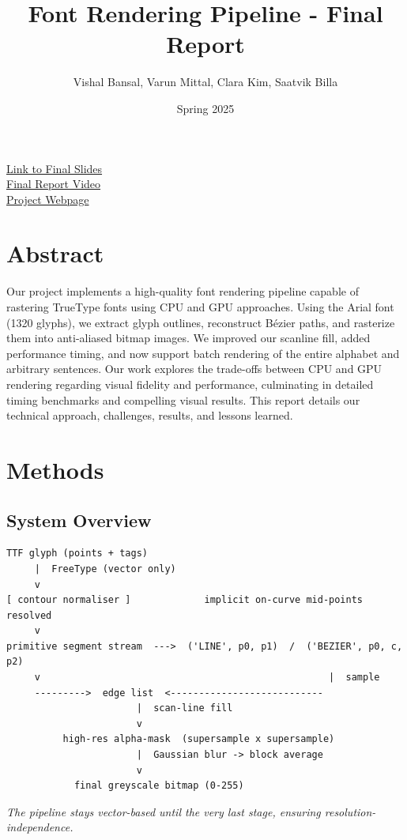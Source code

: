 \documentclass[11pt]{article}
\title{Font Rendering Pipeline - Final Report}
\author{Vishal Bansal, Varun Mittal, Clara Kim, Saatvik Billa}
\date{Spring 2025}
\begin{document}
\doublespacing
\maketitle

\href{https://docs.google.com/presentation/d/1kbRLRtB4DUGVzhKq4TOdJPcwAlWVAb9mF2iKYlNwYdU/edit?usp=sharing}{Link to Final Slides}\\

\href{https://drive.google.com/file/d/18JlJTOpAL61NVxUDC-0UwzD6y9mtmdAb/view?usp=sharing}{Final Report Video}\\

\href{https://vbansal-29.github.io/cs184_final/}{Project Webpage}

\tableofcontents
\newpage

\section{Abstract}

Our project implements a high-quality font rendering pipeline capable of rastering TrueType fonts using CPU and GPU approaches. Using the Arial font (1320 glyphs), we extract glyph outlines, reconstruct Bézier paths, and rasterize them into anti-aliased bitmap images. We improved our scanline fill, added performance timing, and now support batch rendering of the entire alphabet and arbitrary sentences. Our work explores the trade-offs between CPU and GPU rendering regarding visual fidelity and performance, culminating in detailed timing benchmarks and compelling visual results. This report details our technical approach, challenges, results, and lessons learned. \par


\newpage
\section{Methods}

\subsection{System Overview}
\begin{verbatim}
TTF glyph (points + tags)
     |  FreeType (vector only)
     v
[ contour normaliser ]             implicit on-curve mid-points resolved
     v
primitive segment stream  --->  ('LINE', p0, p1)  /  ('BEZIER', p0, c, p2)
     v                                                   |  sample
     --------->  edge list  <---------------------------
                       |  scan-line fill
                       v
          high-res alpha-mask  (supersample x supersample)
                       |  Gaussian blur -> block average
                       v
            final greyscale bitmap (0-255)
\end{verbatim}
\textit{The pipeline stays vector-based until the very last stage, ensuring resolution-independence.} \par
\end{document}
